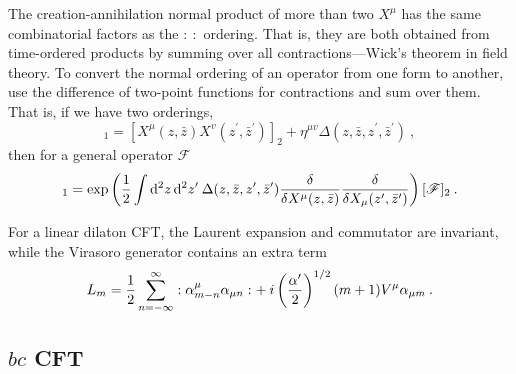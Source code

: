 The creation-annihilation normal product of more than two $X^\mu$ has the same combinatorial factors as the $\mathrel{:\::}$ ordering. That is, they are both obtained from time-ordered products by summing over all contractions—Wick's theorem in field theory.    
To convert the normal ordering of an operator from one form to another, use the difference of two-point functions for contractions and sum over them. That is, if we have two orderings,    
\begin{equation}
	[X^{\mu}(z, \bar{z}) X^{v}(z^{\prime}, \bar{z}^{\prime})]_{1} = [X^{\mu}(z, \bar{z}) X^{v}(z^{\prime}, \bar{z}^{\prime})]_{2} 
	+\eta^{\mu v} \Delta (z, \bar{z}, z^{\prime}, \bar{z}^{\prime}) \:, \label{2.7.13}
\end{equation}
then for a general operator $\mathscr{F}$    
\begin{equation}
	[\mathscr{F}]_{1}=\exp \left(\frac{1}{2} \int \dif^{2} z\, \dif^{2} z^{\prime}\: \Delta(z, \bar{z}, z^{\prime}, \bar{z}^{\prime}) \frac{\delta}{\delta X^{\mu}(z, \bar{z})} \frac{\delta}{\delta X_{\mu}(z^{\prime}, \bar{z}^{\prime})}\right)[\mathscr{F}]_{2} \:.
	\label{2.7.14}
\end{equation}

For a linear dilaton CFT, the Laurent expansion and commutator are invariant, while the Virasoro generator contains an extra term    
\begin{equation}
	L_{m}=\frac{1}{2} \sum_{n=-\infty}^{\infty} \mathrel{ : \alpha_{m-n}^{\mu} \alpha_{\mu n} : } + \:i\left(\frac{\alpha^{\prime}}{2}\right)^{1 / 2}(m+1) V^{\mu} \alpha_{\mu m} \:.
\end{equation}

\subsection*{ $bc$ CFT}


